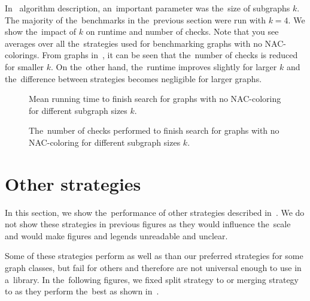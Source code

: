 In~\Subgraphs{} algorithm description, an~important parameter was the~size of subgraphs \( k \).
The majority of the~benchmarks in the~previous section were run with \( k = 4 \).
%
We show the~impact of	\( k \) on runtime and number of checks.
Note that you see averages over all the~strategies used for benchmarking
graphs with no NAC-colorings.
%
From graphs in~,
it can be seen that the~number of checks is reduced for smaller \( k \).
On the~other hand, the~runtime improves slightly for larger \( k \)
and the~difference between strategies becomes negligible for larger graphs.

\begin{figure}[thbp]
	\centering
	\scalebox{\BenchFigureScale}{}
	\caption[Mean runtime for graphs with no NAC-coloring]{
		Mean running time to finish search for graphs with no NAC-coloring for different subgraph sizes \( k \).}%
	\label{fig:graph_no_nac_coloring_first_runtime_subgraph_size}
\end{figure}%
\begin{figure}[thbp]
	\centering
	\scalebox{\BenchFigureScale}{}
	\caption[Checks performed for graphs with no NAC-coloring]{
		The~number of checks performed to finish search for graphs with no NAC-coloring for different subgraph sizes \( k \).}%
	\label{fig:graph_no_nac_coloring_first_checks_subgraph_size}
\end{figure}%


\section{Other strategies}%
\label{sec:other_strategies}

In this section, we show the~performance of other strategies described in~.
We do not show these strategies in previous figures as they would influence
the~scale and would make figures and legends unreadable and unclear.

Some of these strategies perform as well as
than our preferred strategies for some graph classes,
but fail for others and therefore are not universal enough to use in a~library.
%
In the~following figures, we fixed
split strategy to \Neighbors{} or merging strategy to \MergeLinear{}
as they perform the~best as shown in~.

